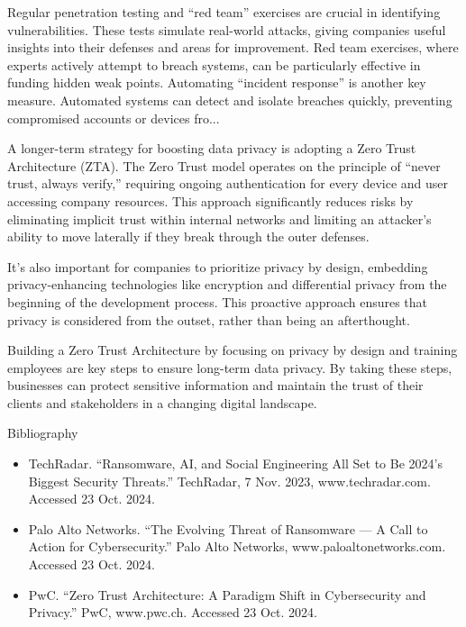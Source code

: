 \documentclass{article}
\begin{document}
Regular penetration testing and “red team” exercises are crucial in identifying vulnerabilities. These tests simulate real-world attacks, giving companies useful insights into their defenses and areas for improvement. Red team exercises, where experts actively attempt to breach systems, can be particularly effective in funding hidden weak points. Automating “incident response” is another key measure. Automated systems can detect and isolate breaches quickly, preventing compromised accounts or devices fro...

A longer-term strategy for boosting data privacy is adopting a Zero Trust Architecture (ZTA). The Zero Trust model operates on the principle of “never trust, always verify,” requiring ongoing authentication for every device and user accessing company resources. This approach significantly reduces risks by eliminating implicit trust within internal networks and limiting an attacker’s ability to move laterally if they break through the outer defenses.

It’s also important for companies to prioritize privacy by design, embedding privacy-enhancing technologies like encryption and differential privacy from the beginning of the development process. This proactive approach ensures that privacy is considered from the outset, rather than being an afterthought.

Building a Zero Trust Architecture by focusing on privacy by design and training employees are key steps to ensure long-term data privacy. By taking these steps, businesses can protect sensitive information and maintain the trust of their clients and stakeholders in a changing digital landscape.

Bibliography
\begin{itemize}
    \item TechRadar. “Ransomware, AI, and Social Engineering All Set to Be 2024's Biggest Security Threats.” TechRadar, 7 Nov. 2023, www.techradar.com. Accessed 23 Oct. 2024.
    \item Palo Alto Networks. “The Evolving Threat of Ransomware — A Call to Action for Cybersecurity.” Palo Alto Networks, www.paloaltonetworks.com. Accessed 23 Oct. 2024.
    \item PwC. “Zero Trust Architecture: A Paradigm Shift in Cybersecurity and Privacy.” PwC, www.pwc.ch. Accessed 23 Oct. 2024.
\end{itemize}
\end{document}
